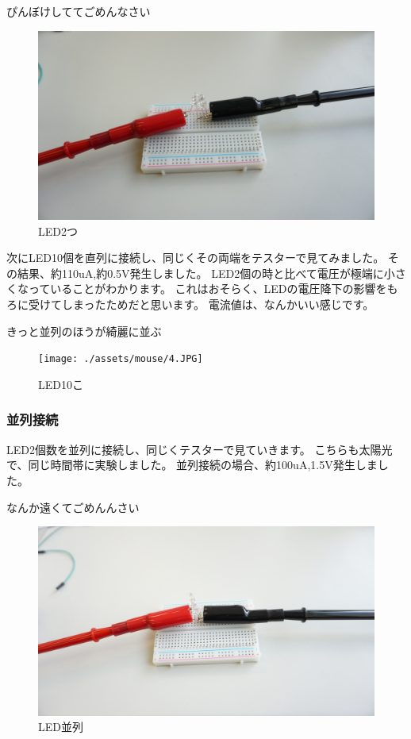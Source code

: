 ぴんぼけしててごめんなさい
\begin{figure}[htbp]
    \centering
    \includegraphics{./assets/mouse/12.JPG}
    \caption{LED2つ}
    \label{fig:led2}
\end{figure}

次にLED10個を直列に接続し、同じくその両端をテスターで見てみました。
その結果、約110uA,約0.5V発生しました。
LED2個の時と比べて電圧が極端に小さくなっていることがわかります。
これはおそらく、LEDの電圧降下の影響をもろに受けてしまったためだと思います。
電流値は、なんかいい感じです。


きっと並列のほうが綺麗に並ぶ
\begin{figure}[htbp]
    \centering
    \texttt{[image: ./assets/mouse/4.JPG]}
    \caption{LED10こ}
    \label{fig:led10}
\end{figure}

\subsubsection{並列接続}
LED2個数を並列に接続し、同じくテスターで見ていきます。
こちらも太陽光で、同じ時間帯に実験しました。
並列接続の場合、約100uA,1.5V発生しました。


なんか遠くてごめんんさい
\begin{figure}[htbp]
    \centering
    \includegraphics{./assets/mouse/13.JPG}
    \caption{LED並列}
    \label{fig:led_par}
\end{figure}


